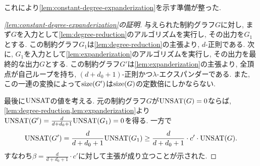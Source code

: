 これにより\cref{lem:constant-degree-expanderization}を示す準備が整った.
\begin{proof}[\cref{lem:constant-degree-expanderization}の証明]

与えられた制約グラフ$G$に対し, まず$G$を入力として\cref{lem:degree-reduction}のアルゴリズムを実行し, その出力を$G_1$とする.
この制約グラフ$G_1$は\cref{lem:degree-reduction}の主張より, $d$-正則である.
次に, $G_1$を入力として\cref{lem:expanderization}のアルゴリズムを実行し, その出力を最終的な出力$G$とする.
この制約グラフ$G'$は\cref{lem:expanderization}の主張より, 全頂点が自己ループを持ち, $(d+d_0+1)$-正則かつ$\lambda$-エクスパンダーである.
また, この一連の変換によって$\mathrm{size}(G')$は$\mathrm{size}(G)$の定数倍にしかならない.

最後に$\mathrm{UNSAT}$の値を考える.
元の制約グラフ$G$が$\mathrm{UNSAT}(G)=0$ならば, \cref{lem:degree-reduction,lem:expanderization}より
$\mathrm{UNSAT}(G') = \frac{d}{d+d_0+1}\mathrm{UNSAT}(G_1) = 0$を得る.
一方で
\begin{align*}
  \mathrm{UNSAT}(G') = \frac{d}{d+d_0+1}\mathrm{UNSAT}(G_1) \ge \frac{d}{d+d_0+1}\cdot c'\cdot\mathrm{UNSAT}(G).
\end{align*}
すなわち$\beta = \frac{d}{d+d_0+1}\cdot c'$に対して主張が成り立つことが示された.
\end{proof}



